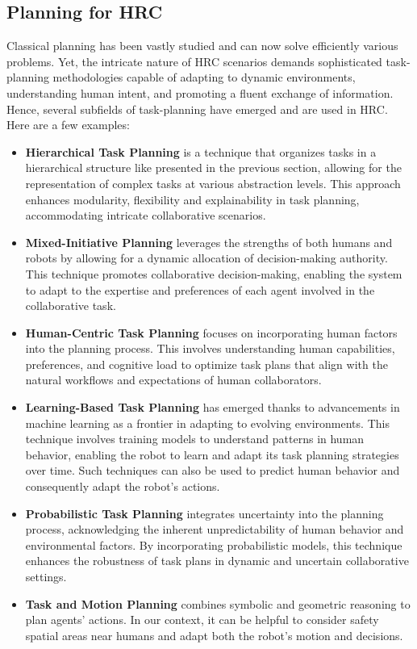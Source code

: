 \subsection{Planning for HRC}

Classical planning has been vastly studied and can now solve efficiently various problems. Yet, the intricate nature of HRC scenarios demands sophisticated task-planning methodologies capable of adapting to dynamic environments, understanding human intent, and promoting a fluent exchange of information. Hence, several subfields of task-planning have emerged and are used in HRC. Here are a few examples:

\begin{itemize}
    \item \textbf{Hierarchical Task Planning} is a technique that organizes tasks in a hierarchical structure like presented in the previous section, allowing for the representation of complex tasks at various abstraction levels. This approach enhances modularity, flexibility and explainability in task planning, accommodating intricate collaborative scenarios.
    
    \item \textbf{Mixed-Initiative Planning} leverages the strengths of both humans and robots by allowing for a dynamic allocation of decision-making authority. This technique promotes collaborative decision-making, enabling the system to adapt to the expertise and preferences of each agent involved in the collaborative task.
    
    \item \textbf{Human-Centric Task Planning} focuses on incorporating human factors into the planning process. This involves understanding human capabilities, preferences, and cognitive load to optimize task plans that align with the natural workflows and expectations of human collaborators.
    
    \item \textbf{Learning-Based Task Planning} has emerged thanks to advancements in machine learning as a frontier in adapting to evolving environments. This technique involves training models to understand patterns in human behavior, enabling the robot to learn and adapt its task planning strategies over time. Such techniques can also be used to predict human behavior and consequently adapt the robot's actions.
    
    \item \textbf{Probabilistic Task Planning} integrates uncertainty into the planning process, acknowledging the inherent unpredictability of human behavior and environmental factors. By incorporating probabilistic models, this technique enhances the robustness of task plans in dynamic and uncertain collaborative settings.
    
    \item \textbf{Task and Motion Planning} combines symbolic and geometric reasoning to plan agents' actions. In our context, it can be helpful to consider safety spatial areas near humans and adapt both the robot's motion and decisions. 
    
\end{itemize}

